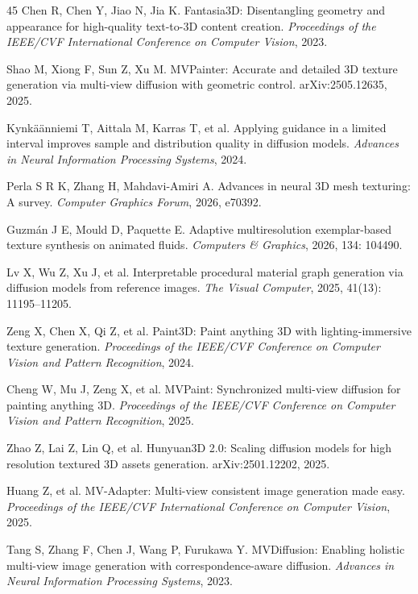 \documentclass[times,twocolumn,final]{elsarticle}
\providecommand{\DIFadd}[1]{{\protect\color{blue} \sf #1}} %
\providecommand{\DIFaddbegin}{} %
\begin{document}
\begin{thebibliography}{45}
Chen R, Chen Y, Jiao N, Jia K. Fantasia3D: Disentangling geometry and appearance for high-quality text-to-3D content creation. \textit{Proceedings of the IEEE/CVF International Conference on Computer Vision}, 2023.

Shao M, Xiong F, Sun Z, Xu M. MVPainter: Accurate and detailed 3D texture generation via multi-view diffusion with geometric control. arXiv:2505.12635, 2025.

Kynk\"a\"anniemi T, Aittala M, Karras T, et al. Applying guidance in a limited interval improves sample and distribution quality in diffusion models. \textit{Advances in Neural Information Processing Systems}, 2024.

Perla S R K, Zhang H, Mahdavi-Amiri A. Advances in neural 3D mesh texturing: A survey. \textit{Computer Graphics Forum}, 2026, e70392.

Guzm\'an J E, Mould D, Paquette E. Adaptive multiresolution exemplar-based texture synthesis on animated fluids. \textit{Computers \& Graphics}, 2026, 134: 104490.

Lv X, Wu Z, Xu J, et al. Interpretable procedural material graph generation via diffusion models from reference images. \textit{The Visual Computer}, 2025, 41(13): 11195--11205.

Zeng X, Chen X, Qi Z, et al. Paint3D: Paint anything 3D with lighting-immersive texture generation. \textit{Proceedings of the IEEE/CVF Conference on Computer Vision and Pattern Recognition}, 2024.

Cheng W, Mu J, Zeng X, et al. MVPaint: Synchronized multi-view diffusion for painting anything 3D. \textit{Proceedings of the IEEE/CVF Conference on Computer Vision and Pattern Recognition}, 2025.

Zhao Z, Lai Z, Lin Q, et al. Hunyuan3D 2.0: Scaling diffusion models for high resolution textured 3D assets generation. arXiv:2501.12202, 2025.

Huang Z, et al. MV-Adapter: Multi-view consistent image generation made easy. \textit{Proceedings of the IEEE/CVF International Conference on Computer Vision}, 2025.

\DIFaddbegin {}
\DIFadd{Tang S, Zhang F, Chen J, Wang P, Furukawa Y. MVDiffusion: Enabling holistic multi-view image generation with correspondence-aware diffusion. \textit{Advances in Neural Information Processing Systems}, 2023.
}


\end{thebibliography}
\end{document}
